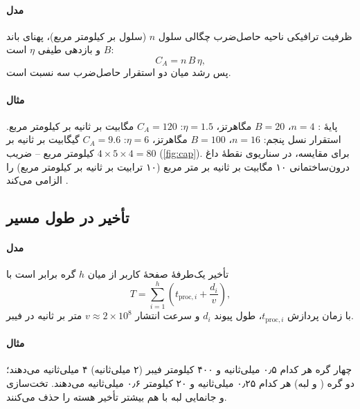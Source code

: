 \documentclass[11pt,a4paper]{article}
\begin{document}
\paragraph{مدل} ظرفیت ترافیکی ناحیه حاصل‌ضرب چگالی سلول $n$ (سلول بر کیلومتر مربع)، پهنای باند $B$ و بازدهی طیفی $\eta$ است:
\begin{equation}\label{eq:area}
  C_A = n\, B\, \eta ,
\end{equation}
پس رشد میان دو استقرار حاصل‌ضرب سه نسبت است.
\paragraph{مثال} پایهٔ : $n = 4$، $B = 20$ مگاهرتز، $\eta = 1.5$: $C_A = 120$ مگابیت بر ثانیه بر کیلومتر مربع. استقرار نسل پنجم: $n = 16$،
$B = 100$ مگاهرتز، $\eta = 6$: $C_A = 9.6$ گیگابیت بر ثانیه بر کیلومتر مربع -- ضریب $4\times5\times4 = 80$ (\cref{fig:cap}). برای مقایسه،  در سناریوی
نقطهٔ داغ درون‌ساختمانی ۱۰ مگابیت بر ثانیه بر متر مربع (۱۰ ترابیت بر ثانیه بر کیلومتر مربع) را الزامی می‌کند \cite{itu2017m2410}.

\begin{acnfigure}
  \caption{رشد ظرفیت ناحیه از پایهٔ  تا استقرار نسل پنجم در \cref{sec:cap}.}
  \label{fig:cap}
\end{acnfigure}

\subsection{تأخیر در طول مسیر}\label{sec:path}
\paragraph{مدل} تأخیر یک‌طرفهٔ صفحهٔ کاربر از میان $h$ گره برابر است با
\begin{equation}\label{eq:path}
  T = \sum_{i=1}^{h} \left( t_{\mathrm{proc},i} + \frac{d_i}{v} \right) ,
\end{equation}
با زمان پردازش $t_{\mathrm{proc},i}$، طول پیوند $d_i$ و سرعت انتشار $v \approx 2\times10^{8}$ متر بر ثانیه در فیبر.
\paragraph{مثال} چهار گره هر کدام ۰٫۵ میلی‌ثانیه و ۴۰۰ کیلومتر فیبر (۲ میلی‌ثانیه) ۴ میلی‌ثانیه می‌دهند؛ دو گره ( و  لبه) هر کدام ۰٫۲۵
میلی‌ثانیه و ۲۰ کیلومتر ۰٫۶ میلی‌ثانیه می‌دهند. تخت‌سازی و جانمایی لبه با هم بیشتر تأخیر هسته را حذف می‌کنند.
\end{document}
